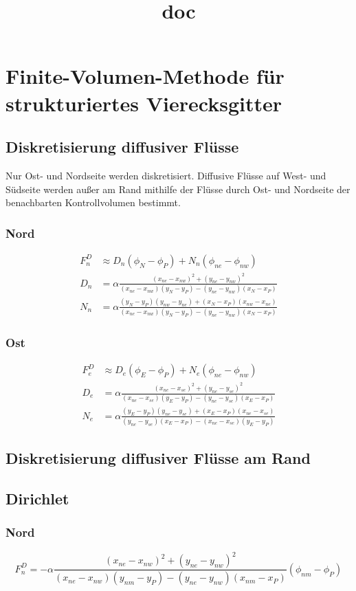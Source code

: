 \documentclass[10pt,a4paper]{article}
\title{doc}
\begin{document}
\section{Finite-Volumen-Methode für strukturiertes Vierecksgitter}
\subsection{Diskretisierung diffusiver Flüsse}
Nur Ost- und Nordseite werden diskretisiert. Diffusive Flüsse auf West- und Südseite werden außer am Rand mithilfe der Flüsse durch Ost- und Nordseite der benachbarten Kontrollvolumen bestimmt.
\subsubsection{Nord}
\begin{align}
F_n^D &\approx D_n ( \phi_N-\phi_P )+N_n(\phi_{ne} - \phi_{nw}) \\
D_n &= \alpha \frac{(x_{ne}-x_{nw})^2 +(y_{ne}-y_{nw})^2}{(x_{ne}-x_{nw})(y_N-y_P)-(y_{ne}-y_{nw})(x_N-x_P)} \\
N_n &= \alpha \frac{(y_N-y_P)(y_{nw}-y_{ne})+(x_N-x_P)(x_{nw}-x_{ne})}{(x_{ne}-x_{nw})(y_N-y_P)-(y_{ne}-y_{nw})(x_N-x_P)}
\end{align}
\subsubsection{Ost}
\begin{align}
F_e^D &\approx D_e ( \phi_E-\phi_P )+N_e(\phi_{ne} - \phi_{nw}) \\
D_e &= \alpha \frac{(x_{ne}-x_{se})^2 +(y_{ne}-y_{se})^2}{(x_{ne}-x_{se})(y_E-y_P)-(y_{ne}-y_{se})(x_E-x_P)} \\
N_e &= \alpha \frac{(y_E-y_P)(y_{ne}-y_{se})+(x_E-x_P)(x_{ne}-x_{se})}{(y_{ne}-y_{se})(x_E-x_P)-(x_{ne}-x_{se})(y_E-y_P)}
\end{align}
\subsection{Diskretisierung diffusiver Flüsse am Rand}
\subsection{Dirichlet}
\subsubsection{Nord}
\begin{equation}
F_n^D = -\alpha \frac{(x_{ne}-x_{nw})^2+(y_{ne}-y_{nw})^2}{(x_{ne}-x_{nw})(y_{nm}-y_P)-(y_{ne}-y_{nw})(x_{nm}-x_P)}(\phi_{nm}-\phi_P)
\end{equation}
\end{document}
